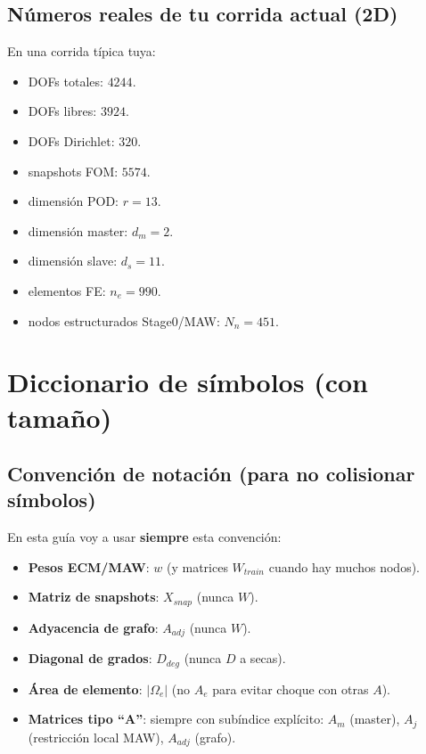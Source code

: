 \documentclass[11pt,a4paper]{article}
\begin{document}
\subsection{Números reales de tu corrida actual (2D)}
En una corrida típica tuya:
\begin{itemize}[leftmargin=1.5em]
\item DOFs totales: $4244$.
\item DOFs libres: $3924$.
\item DOFs Dirichlet: $320$.
\item snapshots FOM: $5574$.
\item dimensión POD: $r=13$.
\item dimensión master: $d_m=2$.
\item dimensión slave: $d_s=11$.
\item elementos FE: $n_e=990$.
\item nodos estructurados Stage0/MAW: $N_n=451$.
\end{itemize}

\section{Diccionario de símbolos (con tamaño)}
\subsection{Convención de notación (para no colisionar símbolos)}
En esta guía voy a usar \textbf{siempre} esta convención:
\begin{itemize}[leftmargin=1.5em]
\item \textbf{Pesos ECM/MAW}: $w$ (y matrices $W_{train}$ cuando hay muchos nodos).
\item \textbf{Matriz de snapshots}: $X_{snap}$ (nunca $W$).
\item \textbf{Adyacencia de grafo}: $A_{adj}$ (nunca $W$).
\item \textbf{Diagonal de grados}: $D_{deg}$ (nunca $D$ a secas).
\item \textbf{Área de elemento}: $|\Omega_e|$ (no $A_e$ para evitar choque con otras $A$).
\item \textbf{Matrices tipo ``A''}: siempre con subíndice explícito:
  $A_m$ (master), $A_j$ (restricción local MAW), $A_{adj}$ (grafo).
\end{itemize}
\end{document}
